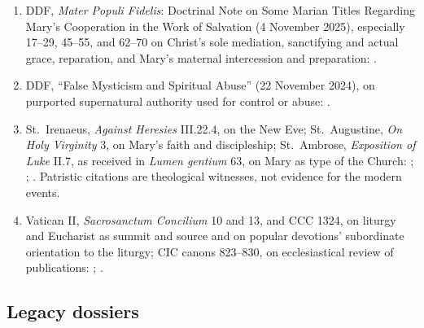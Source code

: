 \begin{enumerate}
  \item DDF, \emph{Mater Populi Fidelis}: Doctrinal Note on Some Marian Titles Regarding Mary's Cooperation in the Work of Salvation (4 November 2025), especially 17--29, 45--55, and 62--70 on Christ's sole mediation, sanctifying and actual grace, reparation, and Mary's maternal intercession and preparation: .
  \item DDF, ``False Mysticism and Spiritual Abuse'' (22 November 2024), on purported supernatural authority used for control or abuse: .
  \item St.~Irenaeus, \emph{Against Heresies} III.22.4, on the New Eve; St.~Augustine, \emph{On Holy Virginity} 3, on Mary's faith and discipleship; St.~Ambrose, \emph{Exposition of Luke} II.7, as received in \emph{Lumen gentium} 63, on Mary as type of the Church: ; ; . Patristic citations are theological witnesses, not evidence for the modern events.
  \item Vatican II, \emph{Sacrosanctum Concilium} 10 and 13, and CCC 1324, on liturgy and Eucharist as summit and source and on popular devotions' subordinate orientation to the liturgy; CIC canons 823--830, on ecclesiastical review of publications: ; .
\end{enumerate}

\subsection{Legacy dossiers}

